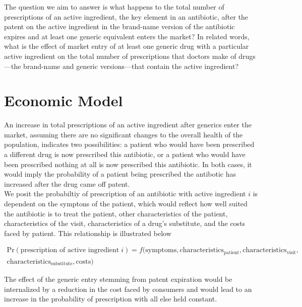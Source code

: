 \documentclass[11pt]{SelfArxOneColBMN}
\begin{document}
The question we aim to answer is what happens to the total number of prescriptions of an active ingredient, the key element in
an antibiotic, after the patent on the active ingredient in the brand-name version of the antibiotic expires and at least one generic equivalent enters the market? In related words, what is the effect of market entry of at least one generic drug with a particular active ingredient on the total number of prescriptions that doctors make of drugs—the brand-name and generic
versions—that contain the active ingredient?

\section{Economic Model}
\label{sec:economic model}

\indent \indent An increase in total prescriptions of an active ingredient after generics enter the market, assuming there are no significant changes to the overall health of the population, indicates two possibilities: a patient who would have been prescribed a different drug is now prescribed this antibiotic, or a patient who would have been prescribed nothing at all is now prescribed this antibiotic. In both cases, it would imply the probability of a patient being prescribed the antibotic has increased after the drug came off patent.\\

We posit the probabiltiy of prescription of an antibiotic with active ingredient $i$ is dependent on the symptons of the patient, which would reflect how well suited the antibiotic is to treat the patient, other characteristics of the patient, characteristics of the visit, characteristics of a drug's substitute, and the costs faced by patient. This relationship is illustrated below

\begin{eqnarray*}
  \text{Pr}(\text{prescription of active ingredient}\; i) = f(\text{symptoms},\text{characteristics}_\text{patient},\text{characteristics}_\text{visit},\\\text{characteristics}_\text{substitute},\text{costs})
\end{eqnarray*}

The effect of the generic entry stemming from patent expiration would be internalized by a reduction in the cost faced by consumers and would lead to an increase in the probability of prescription with all else held constant.
\end{document}
